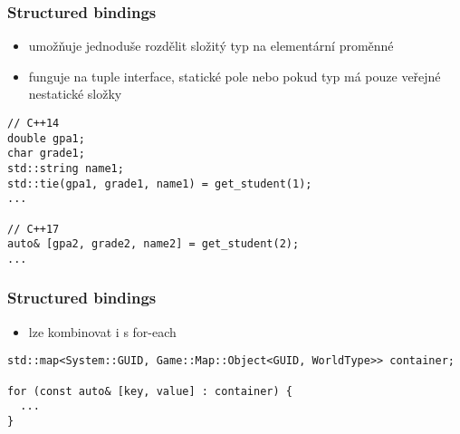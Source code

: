 \begin{frame}[fragile]
\frametitle{Structured bindings}

\begin{bonusblock}{}
\begin{itemize}
\item umožňuje jednoduše rozdělit složitý typ na elementární proměnné 
\item funguje na tuple interface, statické pole nebo pokud typ má pouze veřejné nestatické složky
\end{itemize}
\end{bonusblock}

\begin{yesblock}
\begin{lstlisting}[basicstyle=\small]
// C++14
double gpa1;
char grade1;
std::string name1;
std::tie(gpa1, grade1, name1) = get_student(1);
...

// C++17
auto& [gpa2, grade2, name2] = get_student(2);
...
\end{lstlisting}
\end{yesblock}
\end{frame}












\begin{frame}[fragile]
\frametitle{Structured bindings}

\begin{bonusblock}{}
\begin{itemize}
\item lze kombinovat i s for-each
\end{itemize}
\end{bonusblock}

\begin{yesblock}
\begin{lstlisting}[basicstyle=\small]
std::map<System::GUID, Game::Map::Object<GUID, WorldType>> container;

for (const auto& [key, value] : container) {
  ...
}
\end{lstlisting}
\end{yesblock}
\end{frame}








